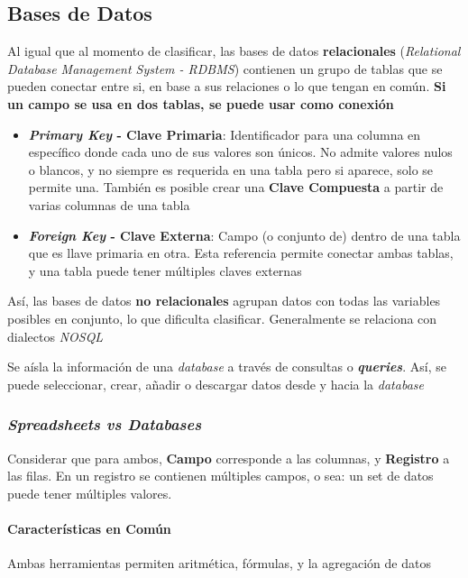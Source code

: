\subsection{Bases de Datos}
Al igual que al momento de clasificar, las bases de datos \textbf{relacionales} (\textit{Relational Database Management System - RDBMS}) contienen un grupo de tablas que se pueden conectar entre si, en base a sus relaciones o lo que tengan en común. \textbf{Si un campo se usa en dos tablas, se puede usar como conexión}

\begin{itemize}
    \item {\textbf{\textit{Primary Key} - Clave Primaria}: Identificador para una columna en específico donde cada uno de sus valores son únicos. No admite valores nulos o blancos, y no siempre es requerida en una tabla pero si aparece, solo se permite una. También es posible crear una \textbf{Clave Compuesta} a partir de varias columnas de una tabla}
    \item {\textbf{\textit{Foreign Key} - Clave Externa}: Campo (o conjunto de) dentro de una tabla que es llave primaria en otra. Esta referencia permite conectar ambas tablas, y una tabla puede tener múltiples claves externas}
\end{itemize}

Así, las bases de datos \textbf{no relacionales} agrupan datos con todas las variables posibles en conjunto, lo que dificulta clasificar. Generalmente se relaciona con dialectos \textit{NOSQL}

Se aísla la información de una \textit{database} a través de consultas o \textit{\textbf{queries}}. Así, se puede seleccionar, crear, añadir o descargar datos desde y hacia la \textit{database}

\subsubsection{\textit{Spreadsheets vs Databases}}
Considerar que para ambos, \textbf{Campo} corresponde a las columnas, y \textbf{Registro} a las filas. En un registro se contienen múltiples campos, o sea: un set de datos puede tener múltiples valores.

\paragraph{Características en Común}
Ambas herramientas permiten aritmética, fórmulas, y la agregación de datos

